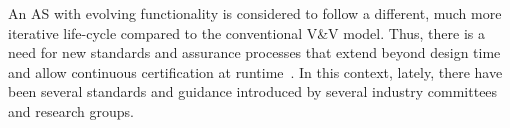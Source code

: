 \documentclass[runningheads]{llncs}
\begin{document}
An AS with evolving functionality is considered to follow a different, much more iterative life-cycle compared to the conventional V\&V model. 
Thus, there is a need for new standards and assurance processes that extend beyond design time and allow continuous certification at runtime~\cite{Rushby2008}. 
In this context, lately, there have been several standards and guidance introduced by several industry committees and research groups. 
\end{document}
